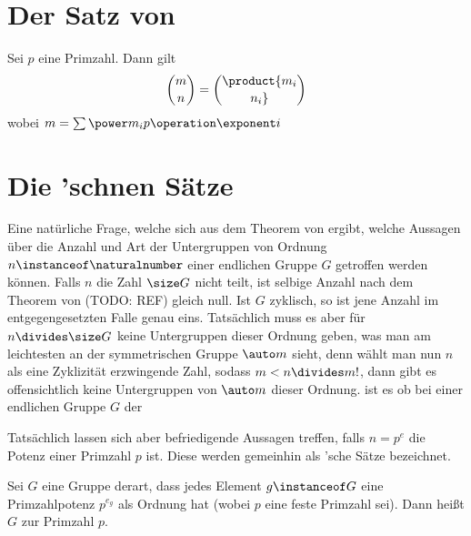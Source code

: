 \section{Der Satz von }

\begin{theorem}
    Sei $p$ eine Primzahl. Dann gilt
    $$
    {m \choose n} = \product {{m_i} \choose {n_i}}
    $$
    wobei $m=\sum \power m_i p\operation\exponent i$
\end{theorem}
%
\section{Die 'schnen Sätze}

Eine natürliche Frage, welche sich aus dem Theorem von  ergibt, welche Aussagen über die Anzahl und Art der
Untergruppen von Ordnung $n\instanceof\naturalnumber$ einer endlichen Gruppe $G$ getroffen werden können.
Falls $n$ die Zahl $\size G$ nicht teilt, ist selbige Anzahl nach dem Theorem von  (TODO: REF) gleich null. Ist $G$ zyklisch, so
ist jene Anzahl im entgegengesetzten Falle genau eins. Tatsächlich muss es aber für $n\divides \size G$ keine Untergruppen dieser
Ordnung geben, was man am leichtesten an der symmetrischen Gruppe $\auto m$ sieht, denn wählt man nun $n$ als eine Zyklizität
erzwingende Zahl, sodass $m<n\divides m!$, dann gibt es offensichtlich keine Untergruppen von $\auto m$ dieser Ordnung.
ist es ob bei einer endlichen Gruppe $G$ der

Tatsächlich lassen sich aber befriedigende Aussagen treffen, falls $n=p^e$ die Potenz einer Primzahl $p$ ist. Diese werden
gemeinhin als 'sche Sätze bezeichnet.

\begin{definition}[Primärgruppe]
    Sei $G$ eine Gruppe derart, dass jedes Element $g\instanceof G$ eine Primzahlpotenz $p^{e_g}$ als Ordnung hat (wobei $p$ eine feste
    Primzahl sei). Dann heißt $G$  zur Primzahl $p$.
\end{definition}

